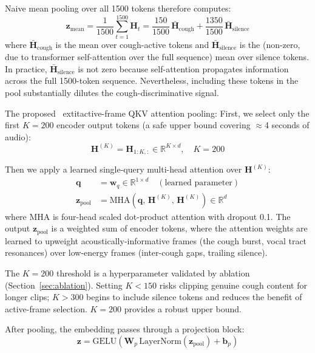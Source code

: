 \documentclass[10pt,journal,compsoc]{IEEEtran}
\begin{document}
Naive mean pooling over all 1500 tokens therefore computes:
\begin{equation}
\mathbf{z}_\mathrm{mean} = \frac{1}{1500} \sum_{t=1}^{1500} \mathbf{H}_t
= \frac{150}{1500}\,\bar{\mathbf{H}}_\mathrm{cough}
+ \frac{1350}{1500}\,\bar{\mathbf{H}}_\mathrm{silence}
\label{eq:mean_pool_dilution}
\end{equation}
where $\bar{\mathbf{H}}_\mathrm{cough}$ is the mean over cough-active
tokens and $\bar{\mathbf{H}}_\mathrm{silence}$ is the (non-zero,
due to transformer self-attention over the full sequence) mean over
silence tokens. In practice, $\bar{\mathbf{H}}_\mathrm{silence}$ is not
zero because self-attention propagates information across the full
1500-token sequence. Nevertheless, including these tokens in the pool
substantially dilutes the cough-discriminative signal.

The proposed \	extit{active-frame QKV attention pooling}:
First, we select only the first $K = 200$ encoder output tokens
(a safe upper bound covering $\approx$4 seconds of audio):
\begin{equation}
\mathbf{H}^{(K)} = \mathbf{H}_{1:K,:} \in \mathbb{R}^{K \times d},
\quad K = 200
\label{eq:active_select}
\end{equation}

Then we apply a learned single-query multi-head attention over
$\mathbf{H}^{(K)}$:
\begin{align}
\mathbf{q} &= \mathbf{w}_q \in \mathbb{R}^{1 \times d}
              \quad (\text{learned parameter})
\label{eq:learned_query} \\
\mathbf{z}_\mathrm{pool} &=
  \mathrm{MHA}\!\left(\mathbf{q},\, \mathbf{H}^{(K)},\, \mathbf{H}^{(K)}\right)
  \in \mathbb{R}^{d}
\label{eq:attnpool_eq}
\end{align}
where MHA is four-head scaled dot-product attention with dropout 0.1.
The output $\mathbf{z}_\mathrm{pool}$ is a weighted sum of encoder
tokens, where the attention weights are learned to upweight
acoustically-informative frames (the cough burst, vocal tract resonances)
over low-energy frames (inter-cough gaps, trailing silence).

The $K=200$ threshold is a hyperparameter validated by ablation
(Section~\ref{sec:ablation}). Setting $K < 150$ risks clipping
genuine cough content for longer clips; $K > 300$ begins to include
silence tokens and reduces the benefit of active-frame selection.
$K = 200$ provides a robust upper bound.

After pooling, the embedding passes through a projection block:
\begin{equation}
\mathbf{z} = \mathrm{GELU}\!\left(\mathbf{W}_p\,
  \mathrm{LayerNorm}(\mathbf{z}_\mathrm{pool}) + \mathbf{b}_p\right)
\label{eq:proj}
\end{equation}
\end{document}
